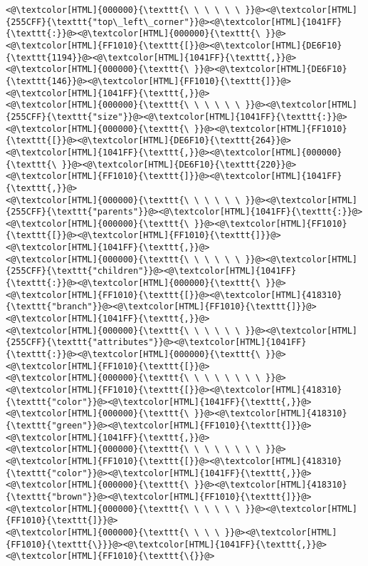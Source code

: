 \begin{lstlisting}
<@\textcolor[HTML]{000000}{\texttt{\ \ \ \ \ \ }}@><@\textcolor[HTML]{255CFF}{\texttt{"top\_left\_corner"}}@><@\textcolor[HTML]{1041FF}{\texttt{:}}@><@\textcolor[HTML]{000000}{\texttt{\ }}@><@\textcolor[HTML]{FF1010}{\texttt{[}}@><@\textcolor[HTML]{DE6F10}{\texttt{1194}}@><@\textcolor[HTML]{1041FF}{\texttt{,}}@><@\textcolor[HTML]{000000}{\texttt{\ }}@><@\textcolor[HTML]{DE6F10}{\texttt{146}}@><@\textcolor[HTML]{FF1010}{\texttt{]}}@><@\textcolor[HTML]{1041FF}{\texttt{,}}@>
<@\textcolor[HTML]{000000}{\texttt{\ \ \ \ \ \ }}@><@\textcolor[HTML]{255CFF}{\texttt{"size"}}@><@\textcolor[HTML]{1041FF}{\texttt{:}}@><@\textcolor[HTML]{000000}{\texttt{\ }}@><@\textcolor[HTML]{FF1010}{\texttt{[}}@><@\textcolor[HTML]{DE6F10}{\texttt{264}}@><@\textcolor[HTML]{1041FF}{\texttt{,}}@><@\textcolor[HTML]{000000}{\texttt{\ }}@><@\textcolor[HTML]{DE6F10}{\texttt{220}}@><@\textcolor[HTML]{FF1010}{\texttt{]}}@><@\textcolor[HTML]{1041FF}{\texttt{,}}@>
<@\textcolor[HTML]{000000}{\texttt{\ \ \ \ \ \ }}@><@\textcolor[HTML]{255CFF}{\texttt{"parents"}}@><@\textcolor[HTML]{1041FF}{\texttt{:}}@><@\textcolor[HTML]{000000}{\texttt{\ }}@><@\textcolor[HTML]{FF1010}{\texttt{[}}@><@\textcolor[HTML]{FF1010}{\texttt{]}}@><@\textcolor[HTML]{1041FF}{\texttt{,}}@>
<@\textcolor[HTML]{000000}{\texttt{\ \ \ \ \ \ }}@><@\textcolor[HTML]{255CFF}{\texttt{"children"}}@><@\textcolor[HTML]{1041FF}{\texttt{:}}@><@\textcolor[HTML]{000000}{\texttt{\ }}@><@\textcolor[HTML]{FF1010}{\texttt{[}}@><@\textcolor[HTML]{418310}{\texttt{"branch"}}@><@\textcolor[HTML]{FF1010}{\texttt{]}}@><@\textcolor[HTML]{1041FF}{\texttt{,}}@>
<@\textcolor[HTML]{000000}{\texttt{\ \ \ \ \ \ }}@><@\textcolor[HTML]{255CFF}{\texttt{"attributes"}}@><@\textcolor[HTML]{1041FF}{\texttt{:}}@><@\textcolor[HTML]{000000}{\texttt{\ }}@><@\textcolor[HTML]{FF1010}{\texttt{[}}@>
<@\textcolor[HTML]{000000}{\texttt{\ \ \ \ \ \ \ \ }}@><@\textcolor[HTML]{FF1010}{\texttt{[}}@><@\textcolor[HTML]{418310}{\texttt{"color"}}@><@\textcolor[HTML]{1041FF}{\texttt{,}}@><@\textcolor[HTML]{000000}{\texttt{\ }}@><@\textcolor[HTML]{418310}{\texttt{"green"}}@><@\textcolor[HTML]{FF1010}{\texttt{]}}@><@\textcolor[HTML]{1041FF}{\texttt{,}}@>
<@\textcolor[HTML]{000000}{\texttt{\ \ \ \ \ \ \ \ }}@><@\textcolor[HTML]{FF1010}{\texttt{[}}@><@\textcolor[HTML]{418310}{\texttt{"color"}}@><@\textcolor[HTML]{1041FF}{\texttt{,}}@><@\textcolor[HTML]{000000}{\texttt{\ }}@><@\textcolor[HTML]{418310}{\texttt{"brown"}}@><@\textcolor[HTML]{FF1010}{\texttt{]}}@>
<@\textcolor[HTML]{000000}{\texttt{\ \ \ \ \ \ }}@><@\textcolor[HTML]{FF1010}{\texttt{]}}@>
<@\textcolor[HTML]{000000}{\texttt{\ \ \ \ }}@><@\textcolor[HTML]{FF1010}{\texttt{\}}}@><@\textcolor[HTML]{1041FF}{\texttt{,}}@> <@\textcolor[HTML]{FF1010}{\texttt{\{}}@>

\end{lstlisting}
